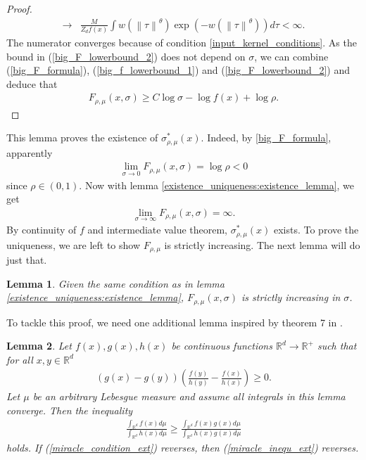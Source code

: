 \documentclass[10pt]{article}
\newcommand{\norm}[1]{\left\lVert#1\right\rVert}
\newtheorem{lemma}{\bf Lemma}
\newenvironment{Proof of lemma}{\noindent{\bf Proof of Lemma}}{\hfill$\Box$\newline}
\newenvironment{Proof of claim}{\noindent{\bf Proof of claim}}{\hfill$\Box$\newline}
\newenvironment{Proof of theorem}{\noindent{\bf Proof of Theorem}}{\hfill\scriptsize{$\Box$}\newline}
\newenvironment{Proof of theorems}{\noindent{\bf Proof of Theorems}}{\hfill$\Box$\newline}
\newenvironment{Proof of proposition}{\noindent{\bf Proof of Proposition}}{\hfill$\Box$\newline}
\newenvironment{Proof of propositions}{\noindent{\bf Proof of Propositions}}{\hfill$\Box$\newline}
\newenvironment{Proof of exercise}{\noindent{\it Proof of Exercise:}}{\hfill$\Box$}
\numberwithin{equation}{section}
\begin{document}
\begin{proof}
\begin{align}
        \to  & \frac{M}{Z_d f(x)} \int w(\norm{\tau}^{\theta})\exp(-w(\norm{\tau}^{\theta}))d\tau < \infty.
    \end{align}
    The numerator converges because of condition \ref{input_kernel_conditions}. As the bound in (\ref{big_F_lowerbound_2}) does not depend on $\sigma$, we can combine (\ref{big_F_formula}), (\ref{big_f_lowerbound_1}) and (\ref{big_F_lowerbound_2}) and deduce that
    \begin{align}
        F_{\rho,\mu}(x,\sigma) \geq C \log \sigma - \log f(x) + \log \rho.
    \end{align}
\end{proof}
This lemma proves the existence of $\sigma^*_{\rho,\mu}(x)$. Indeed, by \eqref{big_F_formula}, apparently
\begin{align} \label{existence_uniqueness:limit_1}
    \lim_{\sigma \to 0} F_{\rho,\mu}(x,\sigma) = \log \rho < 0
\end{align}
since $\rho \in (0,1)$. Now with lemma \ref{existence_uniqueness:existence_lemma}, we get
\begin{align} \label{existence_uniqueness:limit_2}
    \lim_{\sigma \to \infty} F_{\rho,\mu}(x,\sigma) = \infty.
\end{align}
By continuity of $f$ and intermediate value theorem, $\sigma^*_{\rho,\mu}(x)$ exists. To prove the uniqueness, we are left to show $F_{\rho,\mu}$ is strictly increasing. The next lemma will do just that.
\begin{lemma} \label{existence_uniqueness:uniqueness_lemma}
    Given the same condition as in lemma \ref{existence_uniqueness:existence_lemma}, $F_{\rho,\mu}(x,\sigma)$ is strictly increasing in $\sigma$.
\end{lemma}
To tackle this proof, we need one additional lemma inspired by theorem 7 in \cite{liu2000inequ}.
\begin{lemma} \label{miracle_lemma_ext}
    Let $f(x),g(x),h(x)$ be continuous functions $\mathbb{R}^d \to \mathbb{R}^+$ such that for all $x,y \in \mathbb{R}^d$
    \begin{align} \label{miracle_condition_ext}
        \left(g(x)-g(y)\right)\left(\frac{f(y)}{h(y)}-\frac{f(x)}{h(x)}\right) \geq 0.
    \end{align}
    Let $\mu$ be an arbitrary Lebesgue measure and assume all integrals in this lemma converge. Then the inequality
    \begin{align} \label{miracle_inequ_ext}
        \frac{\int_{\mathbb{R}^d} f(x)d\mu}{\int_{\mathbb{R}^d} h(x)d\mu} \geq \frac{\int_{\mathbb{R}^d} f(x)g(x)d\mu}{\int_{\mathbb{R}^d} h(x)g(x)d\mu}
    \end{align}
    holds. If (\ref{miracle_condition_ext}) reverses, then (\ref{miracle_inequ_ext}) reverses.
\end{lemma}
\end{document}
